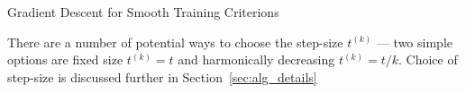 \documentclass[10pt,letterpaper]{article}
\begin{document}
\begin{algorithm}
\caption{Gradient Descent for Smooth Training Criterions}
\label{alg:basic}
\begin{algorithmic}
	\ENDFOR
\end{algorithmic}
\end{algorithm}
There are a number of potential ways to choose the step-size $t^{(k)}$ --- two simple options are fixed size $t^{(k)} = t$ and harmonically decreasing $t^{(k)} = t/k$. Choice of step-size is discussed further in Section~\ref{sec:alg_details}\\
\vspace{1mm}
\end{document}
